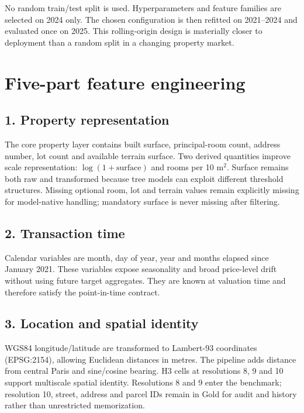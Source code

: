 \documentclass[11pt,a4paper]{article}
\begin{document}
No random train/test split is used. Hyperparameters and feature families are
selected on 2024 only. The chosen configuration is then refitted on 2021--2024
and evaluated once on 2025. This rolling-origin design is materially closer to
deployment than a random split in a changing property market.

\section{Five-part feature engineering}

\subsection{1. Property representation}

The core property layer contains built surface, principal-room count, address
number, lot count and available terrain surface. Two derived quantities improve
scale representation: $\log(1+\text{surface})$ and rooms per 10 m$^2$. Surface
remains both raw and transformed because tree models can exploit different
threshold structures. Missing optional room, lot and terrain values remain
explicitly missing for model-native handling; mandatory surface is never
missing after filtering.

\subsection{2. Transaction time}

Calendar variables are month, day of year, year and months elapsed since
January 2021. These variables expose seasonality and broad price-level drift
without using future target aggregates. They are known at valuation time and
therefore satisfy the point-in-time contract.

\subsection{3. Location and spatial identity}

WGS84 longitude/latitude are transformed to Lambert-93 coordinates
(EPSG:2154), allowing Euclidean distances in metres. The pipeline adds distance
from central Paris and sine/cosine bearing. H3 cells at resolutions 8, 9 and 10
support multiscale spatial identity. Resolutions 8 and 9 enter the benchmark;
resolution 10, street, address and parcel IDs remain in Gold for audit and
history rather than unrestricted memorization.
\end{document}

